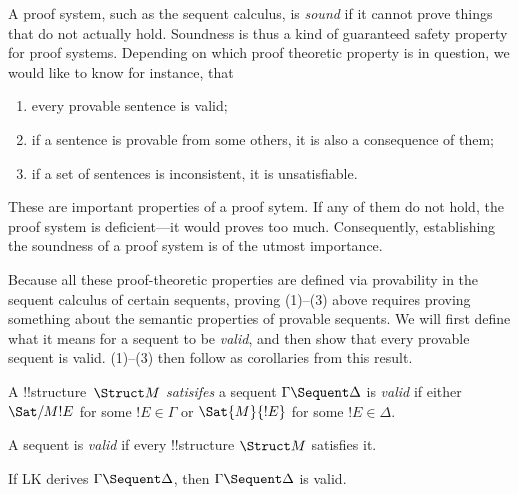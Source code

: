 \documentclass[../../include/open-logic-section]{subfiles}
\begin{document}

\begin{explain}
A proof system, such as the sequent calculus, is \emph{sound} if it
cannot prove things that do not actually hold.  Soundness is thus a
kind of guaranteed safety property for proof systems.  Depending on
which proof theoretic property is in question, we would like to know
for instance, that
\begin{enumerate}
\item every provable sentence is valid;
\item if a sentence is provable from some others, it is also a
  consequence of them;
\item if a set of sentences is inconsistent, it is unsatisfiable.
\end{enumerate}
These are important properties of a proof sytem.  If any of them do
not hold, the proof system is deficient---it would proves too much.
Consequently, establishing the soundness of a proof system is of the
utmost importance.

Because all these proof-theoretic properties are
defined via provability in the sequent calculus of certain sequents,
proving (1)--(3) above requires proving something about the semantic
properties of provable sequents.  We will first define what it means
for a sequent to be \emph{valid}, and then show that every provable
sequent is valid.  (1)--(3) then follow as corollaries from this
result.
\end{explain}

\begin{defn}
A !!{structure}~$\Struct M$ \emph{satisifes} a sequent $\Gamma
\Sequent \Delta$ is \emph{valid} if either $\Sat/{M}{!E}$ for some $!E
\in \Gamma$ or $\Sat{M}{!E}$ for some $!E \in \Delta$.

A sequent is \emph{valid} if every !!{structure} $\Struct M$ satisfies
it.
\end{defn}

\begin{thm}[Soundness]
If LK derives $\Gamma \Sequent \Delta$, then $\Gamma \Sequent \Delta$
is valid.
\end{thm}
\end{document}
